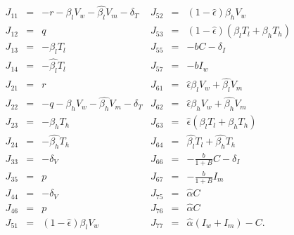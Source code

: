 \documentclass[11pt, oneside]{article}    %
\begin{document}
\begin{center}
$\begin{array}{rclrcl}
J_{11} & =&-r - \beta_l V_w - \hat{\beta_l} V_m -\delta_T                  &J_{52} & = &(1 - \hat{\epsilon}) \beta_h V_w  \\
 J_{12} & = & q                            &J_{53} & = & (1 - \hat{\epsilon} )(\beta_l T_l + \beta_h T_h) \\
 J_{13} & = & -\beta_l T_l                            &J_{55} & = &  -bC - \delta_I  \\
 J_{14} & = &  -\hat{\beta_l} T_l                         &J_{57} & = &  -b I_w  \\
J_{21} & = & r                     & J_{61} & = &\hat{\epsilon}  \beta_l V_w + \hat{\beta_l} V_m \\
 J_{22} & = & -q-\beta_h V_w - \hat{\beta_h} V_m -\delta_T      & J_{62} & = &  \hat{\epsilon}  \beta_h V_w + \hat{\beta_h} V_m \\
J_{23} & = &  -\beta_h T_h                    & J_{63} & = & \hat{\epsilon} (\beta_l T_l + \beta_h T_h) \\%
 J_{24}& = &  -\hat{\beta_h} T_h                   & J_{64} & = &  \hat{\beta_l} T_l +\hat{\beta_h} T_h     \\
J_{33} & = &-\delta_V                   &J_{66} & = & -\frac{b}{1+B} C - \delta_I  \\
J_{35} & = & p                  &J_{67} & = &  -\frac{b}{1+B} I_m \\
 J_{44} & = & -\delta_V                &J_{75} & = & \hat{\alpha}  C  \\
 J_{46} &= & p            &J_{76} & = &  \hat{\alpha} C   \\
J_{51} & = & (1 - \hat{\epsilon}) \beta_l V_w               & J_{77} & = &  \hat{\alpha}(I_w + I_m) - C.   \\


\end{array}$
\end{center}
\end{document}
